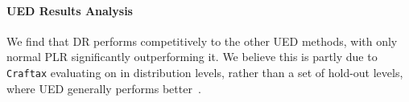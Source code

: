 \documentclass{article}
\theoremstyle{plain}
\theoremstyle{definition}
\theoremstyle{remark}
\begin{document}

\paragraph{UED Results Analysis}
We find that DR performs competitively to the other UED methods, with only normal PLR significantly outperforming it. We believe this is partly due to \texttt{Craftax} evaluating on in distribution levels, rather than a set of hold-out levels, where UED generally performs better~\citep{jiang2021Replayguided,holder2022Evolving}.

\end{document}
